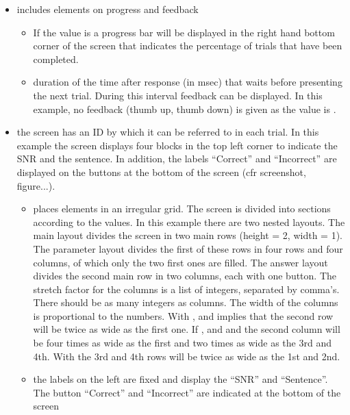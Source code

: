 \begin{itemize}
\item {} includes elements on progress and
feedback
\begin{itemize}

\item {} If the value is  a progress
bar will be displayed in the right hand bottom corner of the
screen that indicates the percentage of trials that have been completed.

\item {} duration of the time after
response (in msec) that \apex waits before presenting the next
trial. During this interval feedback can be displayed. In this
example, no feedback (thumb up, thumb down) is given as the value
is .
\end{itemize}

\item {} the screen has an ID by which it can be
referred to in each trial. In this example the screen displays
four blocks in the top left corner to indicate the SNR and the
sentence. In addition, the labels ``Correct'' and ``Incorrect''
are displayed on the buttons at the bottom of the screen (cfr
screenshot, figure...).
\begin{itemize}

\item {} places elements in an irregular grid.
The screen is divided into sections according to the values. In
this example there are two nested layouts. The main layout divides the screen in two main rows (height = 2, width = 1).
The parameter layout divides the first of these rows in four rows and four columns, of which only the two first ones are filled.
The answer layout divides the second main row in two columns, each with one button.
The stretch factor for the columns is a list of integers, separated by
comma's. There should be as many integers as columns. The width of
the columns is proportional to the numbers. With ,
and   implies that the
second row will be twice as wide as the first one. If
, and  and
 the second column will be four times
as wide as the first and two times as wide as the 3rd and 4th.
With  the 3rd and 4th rows will be
twice as wide as the 1st and 2nd.

\item {} the labels on the left are fixed and display
the  ``SNR'' and ``Sentence''. The button
``Correct'' and ``Incorrect'' are indicated at the bottom of the
screen


\end{itemize}
\end{itemize}

